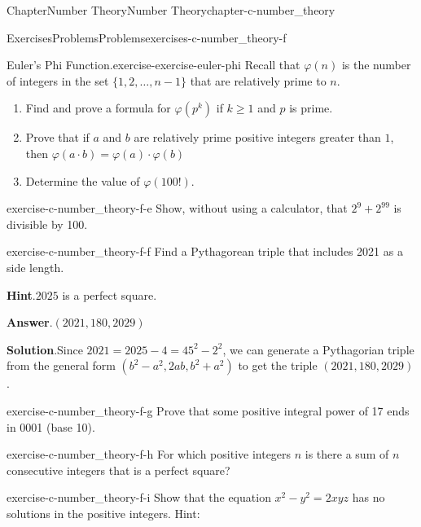 \documentclass[oneside,10pt,]{book}
\newcommand{\blocktitlefont}{\relax}
\numberwithin{equation}{section}
\begin{document}
\begin{chapterptx}{Chapter}{Number Theory}{}{Number Theory}{}{}{chapter-c-number_theory}
\begin{exercises-section}{Exercises}{Problems}{}{Problems}{}{}{exercises-c-number_theory-f}
\begin{divisionexercise}{2}{Euler's Phi Function.}{}{exercise-exercise-euler-phi}
Recall that \(\varphi(n)\) is the number of integers in the set \(\{1,2, \ldots  , n-1\}\) that are relatively prime to \(n\).%
\begin{enumerate}[label=(\alph*)]
\item{}Find and prove a formula for \(\varphi \left(p^k\right)\) if \(k\geq 1\) and \(p\) is prime.%
\item{}Prove that if \(a\) and \(b\) are relatively prime positive integers greater than \(1\), then  \(\varphi(a \cdot b)=\varphi(a) \cdot \varphi(b)\)%
\item{}Determine the value of \(\varphi(100!)\).%
\end{enumerate}
%
\end{divisionexercise}%
\begin{divisionexercise}{3}{}{}{exercise-c-number_theory-f-e}%
Show, without using a calculator, that \(2^9 + 2^{99}\) is divisible by 100.%
\end{divisionexercise}%
\begin{divisionexercise}{4}{}{}{exercise-c-number_theory-f-f}%
Find a Pythagorean triple that includes 2021 as a side length.%
\par\smallskip%
\noindent\textbf{\blocktitlefont Hint}.\hypertarget{hint-c-number_theory-f-f-b}{}\quad{}\(2025\) is a perfect square.%
\par\smallskip%
\noindent\textbf{\blocktitlefont Answer}.\hypertarget{answer-c-number_theory-f-f-c}{}\quad{}\((2021,180,2029)\)%
\par\smallskip%
\noindent\textbf{\blocktitlefont Solution}.\hypertarget{solution-c-number_theory-f-f-d}{}\quad{}Since \(2021 = 2025-4 = 45^2 - 2^2\), we can generate a Pythagorian triple from the general form \((b^2-a^2, 2 a b, b^2 + a^2)\) to get the triple \((2021,180,2029)\).%
\end{divisionexercise}%
\begin{divisionexercise}{5}{}{}{exercise-c-number_theory-f-g}%
Prove that some positive integral power of 17 ends in 0001 (base 10).%
\end{divisionexercise}%
\begin{divisionexercise}{6}{}{}{exercise-c-number_theory-f-h}%
For which positive integers \(n\) is there a sum of \(n\) consecutive integers that is a perfect square?%
\end{divisionexercise}%
\begin{divisionexercise}{7}{}{}{exercise-c-number_theory-f-i}%
Show that the equation \(x^2- y^2=2x y z\) has no solutions in the positive integers. Hint:%
\par\smallskip%

\end{divisionexercise}
\end{exercises-section}
\end{chapterptx}
\end{document}

